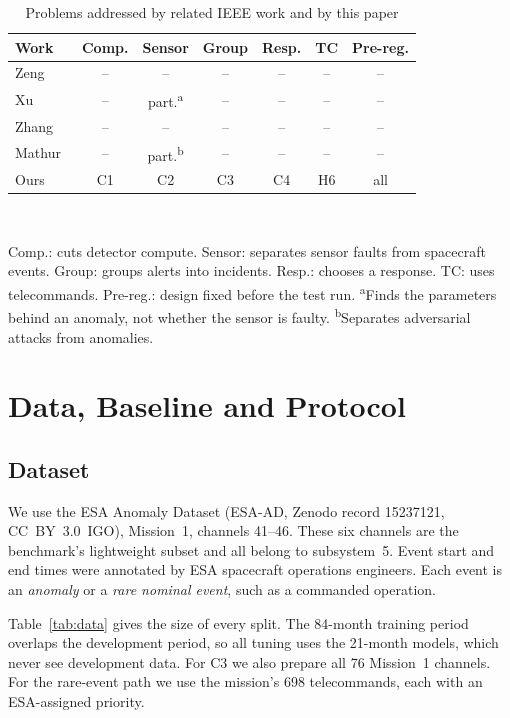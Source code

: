 \documentclass[conference]{IEEEtran}
\begin{document}
\begin{table}[t]
\caption{Problems addressed by related IEEE work and by this paper}\label{tab:novelty}
\centering
\footnotesize
\setlength{\tabcolsep}{3.5pt}
\begin{tabular}{lcccccc}
\toprule
Work & Comp. & Sensor & Group & Resp. & TC & Pre-reg. \\
\midrule
Zeng~\cite{zeng2022causal} & -- & -- & -- & -- & -- & -- \\
Xu~\cite{xu2023taae} & -- & part.\textsuperscript{a} & -- & -- & -- & -- \\
Zhang~\cite{zhang2025fouriergat} & -- & -- & -- & -- & -- & -- \\
Mathur~\cite{mathur2026adeptrs} & -- & part.\textsuperscript{b} & -- & -- & -- & -- \\
Ours & C1 & C2 & C3 & C4 & H6 & all \\
\bottomrule
\end{tabular}
\\[2pt]
\parbox{\columnwidth}{\footnotesize Comp.: cuts detector compute. Sensor: separates sensor faults from spacecraft events. Group: groups alerts into incidents. Resp.: chooses a response. TC: uses telecommands. Pre-reg.: design fixed before the test run. \textsuperscript{a}Finds the parameters behind an anomaly, not whether the sensor is faulty. \textsuperscript{b}Separates adversarial attacks from anomalies.}
\end{table}

\section{Data, Baseline and Protocol}
\subsection{Dataset}
We use the ESA Anomaly Dataset (ESA-AD, Zenodo record 15237121, CC~BY~3.0~IGO), Mission~1, channels 41--46. These six channels are the benchmark's lightweight subset and all belong to subsystem~5. Event start and end times were annotated by ESA spacecraft operations engineers. Each event is an \emph{anomaly} or a \emph{rare nominal event}, such as a commanded operation.

Table~\ref{tab:data} gives the size of every split. The 84-month training period overlaps the development period, so all tuning uses the 21-month models, which never see development data. For C3 we also prepare all 76 Mission~1 channels. For the rare-event path we use the mission's 698 telecommands, each with an ESA-assigned priority.
\end{document}
